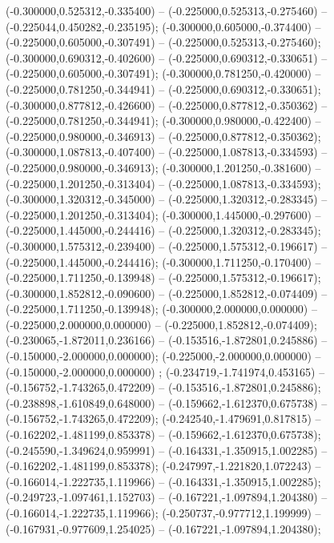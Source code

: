  (-0.300000,0.525312,-0.335400) -- (-0.225000,0.525313,-0.275460) -- (-0.225044,0.450282,-0.235195);
 (-0.300000,0.605000,-0.374400) -- (-0.225000,0.605000,-0.307491) -- (-0.225000,0.525313,-0.275460);
 (-0.300000,0.690312,-0.402600) -- (-0.225000,0.690312,-0.330651) -- (-0.225000,0.605000,-0.307491);
 (-0.300000,0.781250,-0.420000) -- (-0.225000,0.781250,-0.344941) -- (-0.225000,0.690312,-0.330651);
 (-0.300000,0.877812,-0.426600) -- (-0.225000,0.877812,-0.350362) -- (-0.225000,0.781250,-0.344941);
 (-0.300000,0.980000,-0.422400) -- (-0.225000,0.980000,-0.346913) -- (-0.225000,0.877812,-0.350362);
 (-0.300000,1.087813,-0.407400) -- (-0.225000,1.087813,-0.334593) -- (-0.225000,0.980000,-0.346913);
 (-0.300000,1.201250,-0.381600) -- (-0.225000,1.201250,-0.313404) -- (-0.225000,1.087813,-0.334593);
 (-0.300000,1.320312,-0.345000) -- (-0.225000,1.320312,-0.283345) -- (-0.225000,1.201250,-0.313404);
 (-0.300000,1.445000,-0.297600) -- (-0.225000,1.445000,-0.244416) -- (-0.225000,1.320312,-0.283345);
 (-0.300000,1.575312,-0.239400) -- (-0.225000,1.575312,-0.196617) -- (-0.225000,1.445000,-0.244416);
 (-0.300000,1.711250,-0.170400) -- (-0.225000,1.711250,-0.139948) -- (-0.225000,1.575312,-0.196617);
 (-0.300000,1.852812,-0.090600) -- (-0.225000,1.852812,-0.074409) -- (-0.225000,1.711250,-0.139948);
 (-0.300000,2.000000,0.000000) -- (-0.225000,2.000000,0.000000) -- (-0.225000,1.852812,-0.074409);
 (-0.230065,-1.872011,0.236166) -- (-0.153516,-1.872801,0.245886) -- (-0.150000,-2.000000,0.000000);
 (-0.225000,-2.000000,0.000000) -- (-0.150000,-2.000000,0.000000) ;
 (-0.234719,-1.741974,0.453165) -- (-0.156752,-1.743265,0.472209) -- (-0.153516,-1.872801,0.245886);
 (-0.238898,-1.610849,0.648000) -- (-0.159662,-1.612370,0.675738) -- (-0.156752,-1.743265,0.472209);
 (-0.242540,-1.479691,0.817815) -- (-0.162202,-1.481199,0.853378) -- (-0.159662,-1.612370,0.675738);
 (-0.245590,-1.349624,0.959991) -- (-0.164331,-1.350915,1.002285) -- (-0.162202,-1.481199,0.853378);
 (-0.247997,-1.221820,1.072243) -- (-0.166014,-1.222735,1.119966) -- (-0.164331,-1.350915,1.002285);
 (-0.249723,-1.097461,1.152703) -- (-0.167221,-1.097894,1.204380) -- (-0.166014,-1.222735,1.119966);
 (-0.250737,-0.977712,1.199999) -- (-0.167931,-0.977609,1.254025) -- (-0.167221,-1.097894,1.204380);

